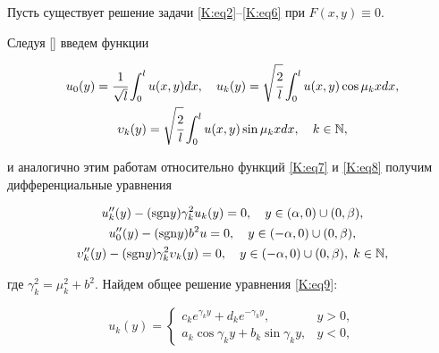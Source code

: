 \smallskip




Пусть существует решение задачи  \eqref{K:eq2}--\eqref{K:eq6} при $F(x,y)\equiv0$. 

Следуя []   введем функции

\begin{gather}

\label{K:eq7}

u_0(y) =\cfrac{1}{\sqrt{l}} \int _0^l u(x,y) dx, \quad u_k(y) =\sqrt{\cfrac2 l} \int _0^l u(x,y) \cos \mu_k x dx,\\

\label{K:eq8}

\upsilon_k(y) =\sqrt{\cfrac2 l} \int _0^l u(x,y) \sin \mu_k x dx, \quad k \in \mathbb{N},

\end{gather}

и аналогично этим работам относительно функций \eqref{K:eq7} и \eqref{K:eq8} получим диф\-фе\-рен\-ци\-аль\-ные уравнения

\begin{gather}

\label{K:eq9}

u''_k(y) - ({\rm sgn} y) \gamma^2_k u_k(y)=0, \quad y \in (\alpha,0)\cup(0, \beta),\\

\label{K:eq10}

u''_0(y)-({\rm sgn} y)b^{2}u =0, \quad y \in (-\alpha, 0) \cup (0,\beta),\\

\label{K:eq11}

\upsilon''_k(y)-({\rm sgn} y) \gamma_k^2 \upsilon_k (y) =0, \quad y \in(-\alpha,0)\cup(0,\beta), \; k\in \mathbb{N},

\end{gather}

где $\gamma^{2}_{k}=\mu^{2}_{k}+b^{2}$. Найдем общее решение уравнения \eqref{K:eq9}:

\begin{equation}

\label{K:eq12}

u_k(y)=\begin{cases}

c_ke^{\gamma_k y}+ d_ke^{-\gamma_{k}y}, & y>0,\\

a_k \cos \gamma_k y +b_k \sin \gamma_k y, & y<0,

\end{cases}

\end{equation}

